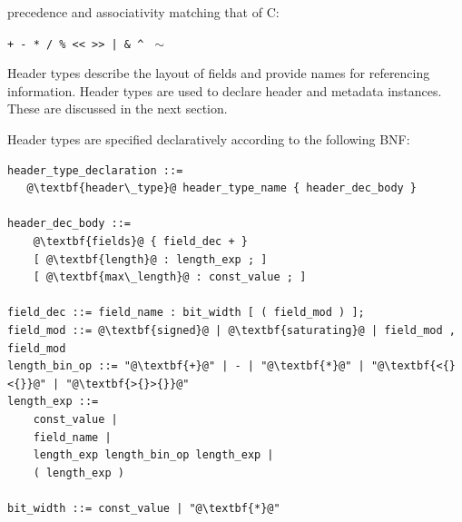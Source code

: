 \documentclass[12pt]{article}
\begin{document}
precedence and associativity matching that of C:

\centerline{\texttt{+ - * / \% << >>  | \&  \^ } $\sim$ }



Header types describe the layout of fields and provide names for referencing
information. Header types are used to declare header and metadata instances.
These are discussed in the next section.

Header types are specified declaratively according to the following BNF:

\begin{lstlisting}[frame=single,backgroundcolor=\color{bnfgreen},escapechar=\@]
header_type_declaration ::=
   @\textbf{header\_type}@ header_type_name { header_dec_body }

header_dec_body ::=
    @\textbf{fields}@ { field_dec + }
    [ @\textbf{length}@ : length_exp ; ]
    [ @\textbf{max\_length}@ : const_value ; ]

field_dec ::= field_name : bit_width [ ( field_mod ) ];
field_mod ::= @\textbf{signed}@ | @\textbf{saturating}@ | field_mod , field_mod
length_bin_op ::= "@\textbf{+}@" | - | "@\textbf{*}@" | "@\textbf{<{}<{}}@" | "@\textbf{>{}>{}}@"
length_exp ::=
    const_value |
    field_name |
    length_exp length_bin_op length_exp |
    ( length_exp )

bit_width ::= const_value | "@\textbf{*}@"
\end{lstlisting}
\end{document}
